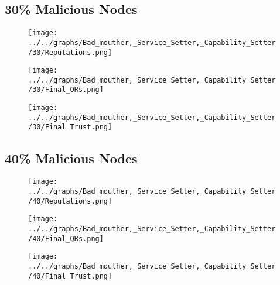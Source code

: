 \begin{minipage}[t]{0.49\columnwidth}
\subsection*{30\% Malicious Nodes}
    \begin{figure}[H]
        \centering
        \texttt{[image: ../../graphs/Bad\_mouther,\_Service\_Setter,\_Capability\_Setter/30/Reputations.png]}
    \end{figure}
    \begin{figure}[H]
        \centering
        \texttt{[image: ../../graphs/Bad\_mouther,\_Service\_Setter,\_Capability\_Setter/30/Final\_QRs.png]}
    \end{figure}
\end{minipage}
\begin{minipage}[t]{0.49\columnwidth}
    \begin{figure}[H]
        \centering
        \texttt{[image: ../../graphs/Bad\_mouther,\_Service\_Setter,\_Capability\_Setter/30/Final\_Trust.png]}
    \end{figure}
\end{minipage}

\begin{minipage}[t]{0.49\columnwidth}
\subsection*{40\% Malicious Nodes}
    \begin{figure}[H]
        \centering
        \texttt{[image: ../../graphs/Bad\_mouther,\_Service\_Setter,\_Capability\_Setter/40/Reputations.png]}
    \end{figure}
    \begin{figure}[H]
        \centering
        \texttt{[image: ../../graphs/Bad\_mouther,\_Service\_Setter,\_Capability\_Setter/40/Final\_QRs.png]}
    \end{figure}
\end{minipage}
\begin{minipage}[t]{0.49\columnwidth}
    \begin{figure}[H]
        \centering
        \texttt{[image: ../../graphs/Bad\_mouther,\_Service\_Setter,\_Capability\_Setter/40/Final\_Trust.png]}
    \end{figure}
\end{minipage}

